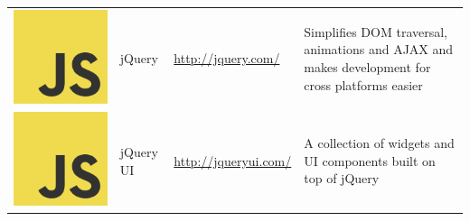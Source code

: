\documentclass[12pt, a4paper]{article}
\begin{document}
\begin{table}[H]
{\begin{tabular}{|m{0.3cm}m{2.4cm}m{5.6cm}m{8.8cm}|}
\includegraphics[scale=0.02]{js.png}& jQuery & \href{http://jquery.com/}{http://jquery.com/} & Simplifies DOM traversal, animations and AJAX and makes development for cross platforms easier \\
\includegraphics[scale=0.02]{js.png}& jQuery UI & \href{http://jqueryui.com/}{http://jqueryui.com/} & A collection of widgets and UI components built on top of jQuery \\

\end{tabular}}
\end{table}
\end{document}
